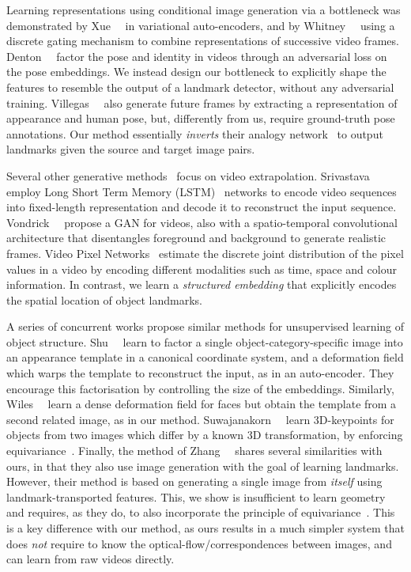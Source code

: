 \documentclass{article}
\begin{document}
Learning representations using conditional image generation via a bottleneck was demonstrated by Xue~\etal{}~\cite{xue16visual} in variational auto-encoders, and by Whitney~\etal{}~\cite{Whitney16} using a discrete gating mechanism to combine representations of successive video frames.
Denton~\etal{}~\cite{denton17} factor the pose and identity in videos through an adversarial loss on the pose embeddings. We instead design our bottleneck to explicitly shape the features to resemble the output of a landmark detector, without any adversarial training. Villegas~\etal{}~\cite{villegas2017learning} also generate future frames by extracting a representation of appearance and human pose, but, differently from us, require ground-truth pose annotations. Our method essentially \emph{inverts} their analogy network~\cite{reed2015deep} to output landmarks given the source and target image pairs.

Several other generative methods~\cite{sutskever2009recurrent,srivastava2015unsupervised,reed2016learning,vondrick2016generating,patraucean2015spatio} focus on video extrapolation. Srivastava~\etal~\cite{srivastava2015unsupervised} employ Long Short Term Memory (LSTM)~\cite{hochreiter1997long} networks to encode video sequences into fixed-length representation and decode it to reconstruct the input sequence. Vondrick~\etal~\cite{vondrick2016generating} propose a GAN for videos, also with a spatio-temporal convolutional architecture that disentangles foreground and background to generate realistic frames. Video Pixel Networks~\cite{kalchbrenner2016video} estimate the discrete joint distribution of the pixel values in a video by encoding different modalities such as time, space and colour information. In contrast, we learn a \emph{structured embedding} that explicitly encodes the spatial location of object landmarks.

A series of concurrent works propose similar methods for unsupervised learning of object structure. Shu~\etal{}~\cite{shu2018deforming} learn to factor a single object-category-specific image into an appearance template in a canonical coordinate system, and a deformation field which warps the template to reconstruct the input, as in an auto-encoder. They encourage this factorisation by controlling the size of the embeddings. Similarly, Wiles~\etal{}~\cite{Wiles18a} learn a dense deformation field for faces but obtain the template from a second related image, as in our method. Suwajanakorn~\etal{}~\cite{suwajanakorn2018discovery} learn 3D-keypoints for objects from two images which differ by a known 3D transformation, by enforcing equivariance~\cite{thewlis17unsupervised}. Finally, the method of Zhang~\etal{}~\cite{zhang2018unsupervised} shares several similarities with ours, in that they also use image generation with the goal of learning landmarks. However, their method is based on generating a single image from \emph{itself} using landmark-transported features. This, we show is insufficient to learn geometry and requires, as they do, to also incorporate the principle of equivariance~\cite{thewlis17unsupervised}. This is a key difference with our method, as ours results in a much simpler system that does \emph{not} require to know the optical-flow/correspondences between images, and can learn from raw videos directly.
\end{document}
